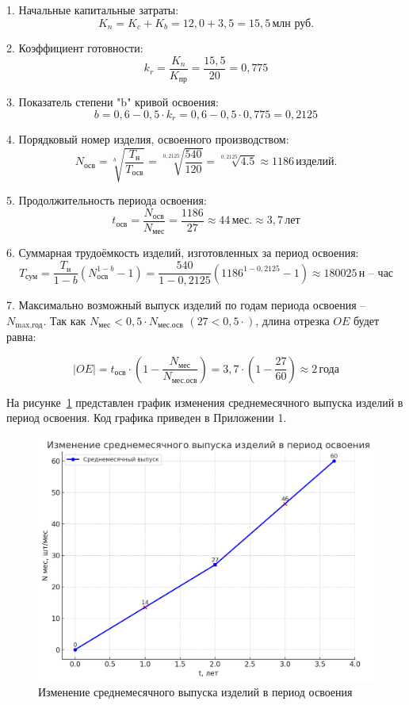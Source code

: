 
1. Начальные капитальные затраты:
\[
K_n = K_c + K_b = 12,0 + 3,5 = 15,5 \, \text{млн руб.}
\]

2. Коэффициент готовности:
\[
k_r = \frac{K_n}{K_{\text{пр}}} = \frac{15,5}{20} = 0,775
\]

3. Показатель степени "b" кривой освоения:
\[
b = 0,6 - 0,5 \cdot k_r = 0,6 - 0,5 \cdot 0,775 = 0,2125
\]

4. Порядковый номер изделия, освоенного производством:
\[
    N_{\text{осв}} = \sqrt[b]{\frac{T_{\text{н}}}{T_{\text{осв}}}} = \sqrt[0,2125]{\frac{540}{120}} = \sqrt[0,2125]{4.5} \approx 1186 \, \text{изделий.}
\]

5. Продолжительность периода освоения:
\[
t_{\text{осв}} = \frac{N_{\text{осв}}}{N_{\text{мес}}} = \frac{1186}{27} \approx 44 \, \text{мес.} \approx 3,7 \, \text{лет}
\]

6. Суммарная трудоёмкость изделий, изготовленных за период освоения:
\[
T_{\text{сум}} = \frac{T_{\text{н}}}{1 - b} \left(N_{\text{осв}}^{1 - b} - 1\right) = \frac{540}{1 - 0,2125} \left(1186^{1 - 0,2125} - 1\right) \approx 180025 \, \text{н -- час}
\]

7. Максимально возможный выпуск изделий по годам периода освоения -- $N_{\text{max,год}}$. Так как $N_{\text{мес}} < 0,5 \cdot N_{\text{мес.осв}}$ $(27 < 0,5 \cdot)$, длина отрезка $OE$ будет равна:

\[
|OE| = t_{\text{осв}} \cdot \left( 1 - \frac{N_{\text{мес}}}{N_{\text{мес.осв}}} \right) = 3,7 \cdot \left( 1 - \frac{27}{60} \right) \approx 2 \, \text{года}
\]

На рисунке~\ref{fig:fig01} представлен график изменения среднемесячного выпуска изделий в период освоения. Код графика приведен в Приложении 1.

\begin{figure}
  \centering
  \includegraphics[scale=0.7]{inc/graph.png}
  \caption{Изменение среднемесячного выпуска изделий в период освоения}
  \label{fig:fig01}
\end{figure}

